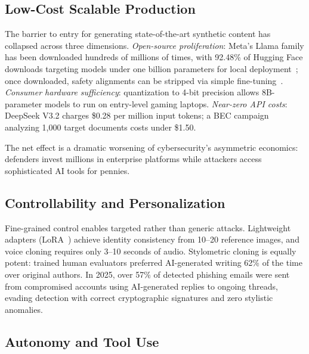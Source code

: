 \subsection{Low-Cost Scalable Production}
\label{sec:cap-scale}

The barrier to entry for generating state-of-the-art synthetic content has collapsed across three dimensions. \emph{Open-source proliferation}: Meta's Llama family has been downloaded hundreds of millions of times, with 92.48\% of Hugging Face downloads targeting models under one billion parameters for local deployment~\cite{llama3}; once downloaded, safety alignments can be stripped via simple fine-tuning~\cite{aisafetyreport2025}. \emph{Consumer hardware sufficiency}: quantization to 4-bit precision allows 8B-parameter models to run on entry-level gaming laptops. \emph{Near-zero API costs}: DeepSeek V3.2 charges \$0.28 per million input tokens; a BEC campaign analyzing 1,000 target documents costs under \$1.50.

The net effect is a dramatic worsening of cybersecurity's asymmetric economics: defenders invest millions in enterprise platforms while attackers access sophisticated AI tools for pennies.


\subsection{Controllability and Personalization}
\label{sec:cap-control}

Fine-grained control enables targeted rather than generic attacks. Lightweight adapters (LoRA~\cite{hu2022lora}) achieve identity consistency from 10--20 reference images, and voice cloning requires only 3--10 seconds of audio. Stylometric cloning is equally potent: trained human evaluators preferred AI-generated writing 62\% of the time over original authors. In 2025, over 57\% of detected phishing emails were sent from compromised accounts using AI-generated replies to ongoing threads, evading detection with correct cryptographic signatures and zero stylistic anomalies.


\subsection{Autonomy and Tool Use}
\label{sec:cap-autonomy}

